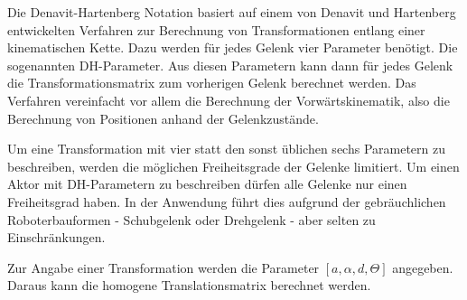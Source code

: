 \label{dh-p}

Die Denavit-Hartenberg Notation basiert auf einem von Denavit und Hartenberg 
entwickelten Verfahren zur Berechnung von Transformationen entlang einer 
kinematischen Kette. Dazu werden für jedes 
Gelenk vier Parameter benötigt. Die sogenannten \ac{DH-Parameter}. Aus diesen
Parametern kann dann für jedes Gelenk die Transformationsmatrix zum vorherigen 
Gelenk berechnet werden. Das Verfahren vereinfacht vor allem die Berechnung 
der Vorwärtskinematik, also die Berechnung von Positionen anhand der 
Gelenkzustände. 

Um eine Transformation mit vier statt den sonst üblichen 
sechs Parametern zu beschreiben, werden die möglichen Freiheitsgrade der Gelenke
limitiert. Um einen Aktor mit \ac{DH-Parameter}n zu beschreiben dürfen alle
Gelenke nur einen Freiheitsgrad haben. In der Anwendung führt dies aufgrund der
gebräuchlichen Roboterbauformen - Schubgelenk oder Drehgelenk - aber selten zu Einschränkungen.

Zur Angabe einer Transformation werden die 
Parameter $[a, \alpha, d, \Theta]$ angegeben. Daraus kann die homogene 
Translationsmatrix berechnet werden.\cite{craig2005}
